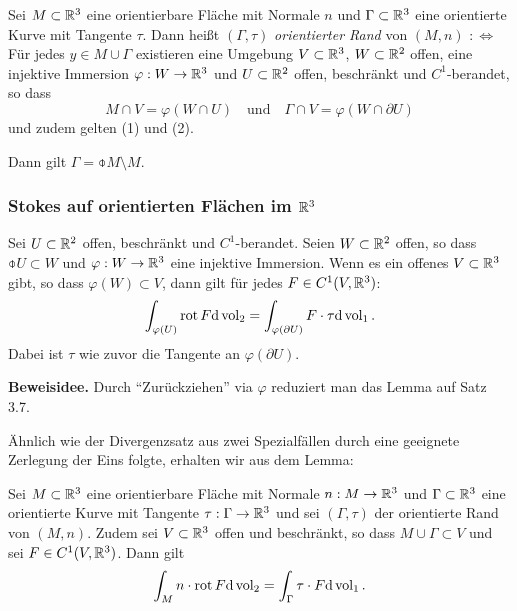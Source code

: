 Sei $M \subset \mathbb{R}^3$ eine orientierbare Fläche mit Normale $n$ und $\Gamma \subset \mathbb{R}^3$ eine orientierte Kurve mit Tangente $\tau$. Dann heißt $(\Gamma, \tau)$ \emph{orientierter Rand} von $(M,n)$ $:\Leftrightarrow$ Für jedes $y \in M \cup \Gamma$ existieren eine Umgebung $V \subset \mathbb{R}^3$, $W \subset \mathbb{R}^2$ offen, eine injektive Immersion $\varphi: W \to \mathbb{R}^3$ und $U \subset \mathbb{R}^2$ offen, beschränkt und $C^1$-berandet, so dass
\[ M \cap V = \varphi(W \cap U) \quad \text{und} \quad \Gamma \cap V = \varphi( W \cap \partial U ) \]
und zudem gelten (1) und (2).

\begin{rmrk}
 Dann gilt $\Gamma = \obar{M} \setminus M$.
\end{rmrk}

\clearpage

\subsubsection{Stokes auf orientierten Flächen im \texorpdfstring{$\mathbb{R}^3$}{IR3}}
\begin{lem}
 Sei $U \subset \mathbb{R}^2$ offen, beschränkt und $C^1$-berandet. Seien $W \subset \mathbb{R}^2$ offen, so dass $\obar{U} \subset W$ und $\varphi:W \to \mathbb{R}^3$ eine injektive Immersion. Wenn es ein offenes $V \subset \mathbb{R}^3$ gibt, so dass $\varphi(W) \subset V$, dann gilt für jedes $F \in C^1(V,\mathbb{R}^3)$:
 \[ \int_{\varphi(U)} \operatorname{rot} F \mathrm{d} \operatorname{vol}_2 = \int_{\varphi(\partial U)} F \cdot \tau \mathrm{d} \operatorname{vol}_1. \]
 Dabei ist $\tau$ wie zuvor die Tangente an $\varphi(\partial U)$.
\end{lem}

\textbf{Beweisidee.}
Durch ``Zurückziehen'' via $\varphi$ reduziert man das Lemma auf Satz 3.7.

Ähnlich wie der Divergenzsatz aus zwei Spezialfällen durch eine geeignete Zerlegung der Eins folgte, erhalten wir aus dem Lemma:
\begin{thm}
 Sei $M \subset \mathbb{R}^3$ eine orientierbare Fläche mit Normale $n: M \to \mathbb{R}^3$ und $\Gamma \subset \mathbb{R}^3$ eine orientierte Kurve mit Tangente $\tau: \Gamma \to \mathbb{R}^3$ und sei $(\Gamma,\tau)$ der orientierte Rand von $(M,n)$. Zudem sei $V \subset \mathbb{R}^3$ offen und beschränkt, so dass $M \cup \Gamma \subset V$ und sei $F \in C^1(V,\mathbb{R}^3)$. Dann gilt
 \[ \int_M n \cdot \operatorname{rot} F \mathrm{d} \operatorname{vol}_2 = \int_\Gamma \tau \cdot F \mathrm{d} \operatorname{vol}_1. \]
\end{thm}


